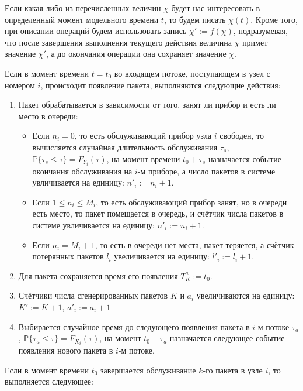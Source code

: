 Если какая-либо из перечисленных величин $\chi$ будет нас интересовать в определенный момент модельного времени $t$, то будем писать $\chi(t)$. Кроме того, при описании операций будем использовать запись $\chi' := f(\chi)$, подразумевая, что после завершения выполнения текущего действия величина $\chi$ примет значение $\chi'$, а до окончания операции она сохраняет значение $\chi$.

Если в момент времени $t = t_0$ во входящем потоке, поступающем в узел с номером $i$, происходит появление пакета, выполняются следующие действия:

\begin{enumerate}

\item{Пакет обрабатывается в зависимости от того, занят ли прибор и есть ли место в очереди:\begin{itemize}
\item Если $n_i = 0$, то есть обслуживающий прибор узла $i$ свободен, то вычисляется случайная длительность обслуживания $\tau_s$, $\mathbb{P}\{\tau_s \leqslant \tau\} = F_{Y_i}(\tau)$, на момент времени $t_0 + \tau_s$ назначается событие окончания обслуживания на $i$-м приборе, а число пакетов в системе увличивается на единицу: $n'_i := n_i + 1$.
\item Если $1 \leqslant n_i \leqslant M_i$, то есть обслуживающий прибор занят, но в очереди есть место, то пакет помещается в очередь, и счётчик числа пакетов в системе увличивается на единицу: $n'_i := n_i + 1$.
\item Если $n_i = M_i + 1$, то есть в очереди нет места, пакет теряется, а счётчик потерянных пакетов $l_i$ увеличивается на единицу: $l'_i := l_i + 1$.
\end{itemize}}

\item{Для пакета сохраняется время его появления $T_K^a := t_0$.}
\item{Счётчики числа сгенерированных пакетов $K$ и $a_i$ увеличиваются на единицу: $K' := K + 1$, $a'_i := a_i + 1$}
\item{Выбирается случайное время до следующего появления пакета в $i$-м потоке $\tau_a$, $\mathbb{P}\{ \tau_a \leqslant \tau \} = F_{X_i}(\tau)$, на момент $t_0 + \tau_a$ назначается следующее событие появления нового пакета в $i$-м потоке.}

\end{enumerate}


Если в момент времени $t_0$ завершается обслуживание $k$-го пакета в узле $i$, то выполняется следующее:

